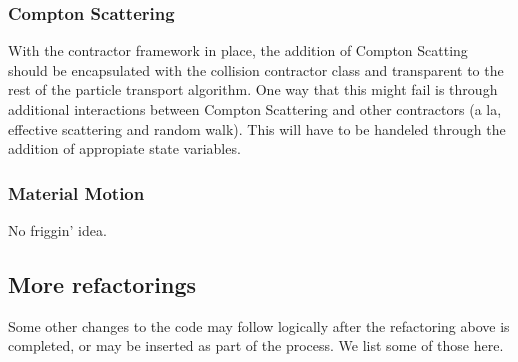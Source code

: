 \documentclass[memo]{ResearchNote}
\begin{document}
\subsubsection{Compton Scattering}

With the contractor framework in place, the addition of Compton
Scatting should be encapsulated with the collision contractor class
and transparent to the rest of the particle transport algorithm. One
way that this might fail is through additional interactions between
Compton Scattering and other contractors (a la, effective scattering
and random walk). This will have to be handeled through the addition
of appropiate state variables. 

\subsubsection{Material Motion}

No friggin' idea.

\subsection{More refactorings}

Some other changes to the code may follow logically after the
refactoring above is completed, or may be inserted as part of the
process. We list some of those here.
\end{document}
